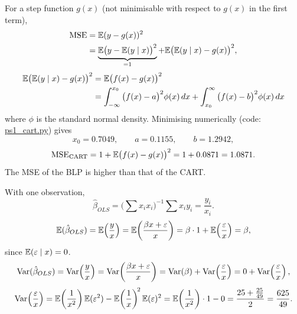 \documentclass[11pt]{article}
\begin{document}
For a step function $g(x)$ (not minimisable with respect to $g(x)$ in the first term),
\[
\begin{aligned}
\mathrm{MSE}&=\mathbb{E}(y-g(x))^2\\
&=\underbrace{\mathbb{E}\big(y-\mathbb{E}(y\mid x)\big)^2}_{=1}+\mathbb{E}\big(\mathbb{E}(y\mid x)-g(x)\big)^2 ,
\end{aligned}
\]
\[
\begin{aligned}
\mathbb{E}\big(\mathbb{E}(y\mid x)-g(x)\big)^2&=\mathbb{E}\big(f(x)-g(x)\big)^2\\
&=\int_{-\infty}^{x_0}\big(f(x)-a\big)^2\phi(x)\,dx+\int_{x_0}^{\infty}\big(f(x)-b\big)^2\phi(x)\,dx
\end{aligned}
\]
where $\phi$ is the standard normal density. Minimising numerically (code: \href{https://github.com/ae4292/Econometrics_PSets/blob/main/ps1/ps1_cart.py}{ps1\_cart.py}) gives
\[
x_0=0.7049,\qquad a=0.1155,\qquad b=1.2942 ,
\]
\[
\mathrm{MSE}_{\mathrm{CART}}=1+\mathbb{E}\big(f(x)-g(x)\big)^2=1+0.0871=1.0871 .
\]
The MSE of the BLP is higher than that of the CART.

\begin{center}
\end{center}


With one observation,
\[
\hat\beta_{OLS}=\Big(\sum x_i x_i\Big)^{-1}\sum x_i y_i=\frac{y_i}{x_i}.
\]
\[
\mathbb{E}(\hat\beta_{OLS})=\mathbb{E}\!\left(\frac{y}{x}\right)=\mathbb{E}\!\left(\frac{\beta x+\varepsilon}{x}\right)
=\beta\cdot1+\mathbb{E}\!\left(\frac{\varepsilon}{x}\right)=\beta,
\]
since $\mathbb{E}(\varepsilon\mid x)=0$.
\[
\operatorname{Var}(\hat\beta_{OLS})=\operatorname{Var}\!\left(\frac yx\right)=\operatorname{Var}\!\left(\frac{\beta x+\varepsilon}{x}\right)
=\operatorname{Var}(\beta)+\operatorname{Var}\!\left(\frac\varepsilon x\right)=0+\operatorname{Var}\!\left(\frac\varepsilon x\right),
\]
\[
\operatorname{Var}\!\left(\frac\varepsilon x\right)=\mathbb{E}\!\left(\frac1{x^2}\right)\mathbb{E}(\varepsilon^2)-\mathbb{E}\!\left(\frac1x\right)^{\!2}\mathbb{E}(\varepsilon)^2
=\mathbb{E}\!\left(\frac1{x^2}\right)\cdot1-0
=\frac{25+\frac{25}{49}}{2}=\frac{625}{49}.
\]
\end{document}
